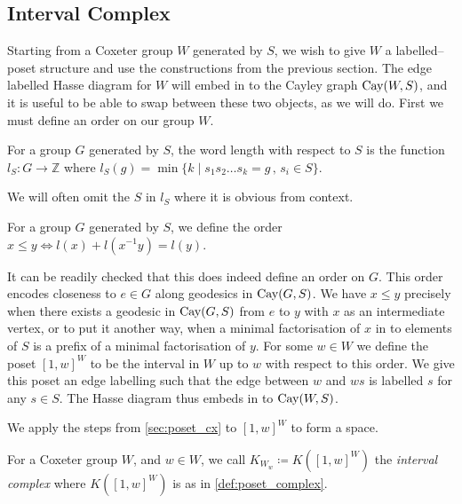 \documentclass[class=article, crop=false]{standalone}
\begin{document}
\subsection{Interval Complex}

Starting from a Coxeter group $W$ generated by $S$, we wish to give $W$ a labelled--poset structure and use the constructions from the previous section. The edge labelled Hasse diagram for $W$ will embed in to the Cayley graph $\text{Cay}(W,S)$, and it is useful to be able to swap between these two objects, as we will do. First we must define an order on our group $W$.
\begin{definition}
    For a group $G$ generated by $S$, the word length with respect to $S$ is the function $l_S:G\to \mathbb{Z}$ where $l_S(g) = \min\{k \mid s_1s_2\ldots s_k=g \,,\, s_i \in S \}$.
\end{definition}

We will often omit the $S$ in $l_S$ where it is obvious from context.

\begin{definition}
    For a group $G$ generated by $S$, we define the order $x \leq y \iff l(x) + l(x^{-1}y) = l(y)$.
\end{definition}

It can be readily checked that this does indeed define an order on $G$. This order encodes closeness to $e \in G$ along geodesics in $\text{Cay}(G,S)$. We have $x \leq y$ precisely when there exists a geodesic in $\text{Cay}(G, S)$ from $e$ to $y$ with $x$ as an intermediate vertex, or to put it another way, when a minimal factorisation of $x$ in to elements of $S$ is a prefix of a minimal factorisation of $y$.
For some $w \in W$ we define the poset $[1,w]^W$ to be the interval in $W$ up to $w$ with respect to this order. We give this poset an edge labelling such that the edge between $w$ and $ws$ is labelled $s$ for any $s \in S$. The Hasse diagram thus embeds in to $\text{Cay}(W,S)$.

We apply the steps from \cref{sec:poset_cx} to $[1,w]^W$ to form a space.

\begin{definition}
    For a Coxeter group $W$, and $w \in W$, we call $K_{W_w} \coloneq K([1,w]^W)$ the \emph{interval complex} where $K([1,w]^W)$ is as in \cref{def:poset_complex}.
    \label{def:interval_complex}
\end{definition}
\end{document}
